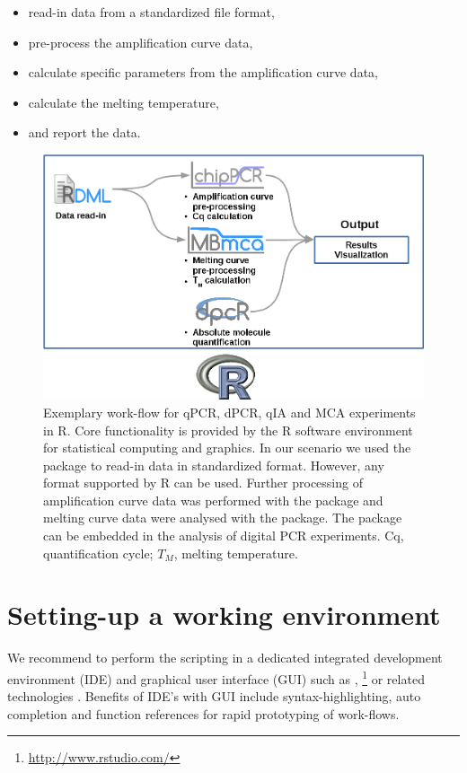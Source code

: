 \begin{itemize}
 \item read-in data from a standardized file format,
 \item pre-process the amplification curve data,
 \item calculate specific parameters from the amplification curve data,
 \item calculate the melting temperature,
 \item and report the data.
\end{itemize}

\begin{figure}[htbp]
  \centering
  \includegraphics{figures/workflow.png}
  \caption{Exemplary work-flow for qPCR, dPCR, qIA and MCA experiments in R. Core 
functionality is provided by the R software environment for statistical 
computing and graphics. In our scenario we used the  package to 
read-in data in standardized format. However, any format supported by R can be 
used. Further processing of amplification curve data was performed with the 
 package and melting curve data were analysed with the 
 package. The  package can be embedded in the 
analysis of digital PCR experiments. Cq, quantification cycle; $T_{M}$, melting 
temperature. 
} \label{figure:workflow}
\end{figure}

\section{Setting-up a working environment}

We recommend to perform the scripting in a dedicated integrated development 
environment (IDE) and graphical user interface (GUI) such as  
\citep{rodiger_rkward_2012}, 
\footnote{\url{http://www.rstudio.com/}} or related technologies 
\citep{Valero_2012}. Benefits of IDE's with GUI include syntax-highlighting, 
auto completion and function references for rapid prototyping of work-flows.

